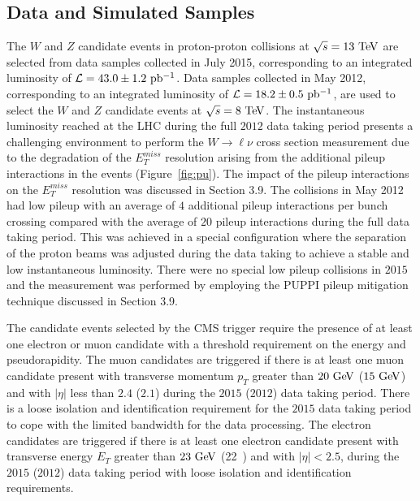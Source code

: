 \subsection{Data and Simulated Samples}

The $W$ and $Z$ candidate events in proton-proton collisions at $\sqrt{s}=13~\mathrm{Te\kern -0.1em V}$ are selected from data samples collected in July 2015, corresponding to an integrated luminosity of $\mathcal{L}=43.0\pm1.2~\mathrm{pb^{-1}}$. Data samples collected in May 2012, corresponding to an integrated luminosity of $\mathcal{L}=18.2\pm0.5~\mathrm{pb^{-1}}$, are used to select the $W$ and $Z$ candidate events at $\sqrt{s}=8~\mathrm{Te\kern -0.1em V}$. The instantaneous luminosity reached at the LHC during the full $2012$ data taking period presents a challenging environment to perform the $W \rightarrow \ell \nu$ cross section measurement due to the degradation of the $E_{T}^{miss}$ resolution arising from the additional pileup interactions in the events (Figure~\ref{fig:pu}). The impact of the pileup interactions on the $E_{T}^{miss}$ resolution was discussed in Section 3.9. The collisions in May 2012 had low pileup with an average of $4$ additional pileup interactions per bunch crossing compared with the average of $20$ pileup interactions during the full data taking period. This was achieved in a special configuration where the separation of the proton beams was adjusted during the data taking to achieve a stable and low instantaneous luminosity. There were no special low pileup collisions in $2015$ and the measurement was performed by employing the PUPPI pileup mitigation technique discussed in Section 3.9.

The candidate events selected by the CMS trigger require the presence of at least one electron or muon candidate with a threshold requirement on the energy and pseudorapidity. The muon candidates are triggered if there is at least one muon candidate present with transverse momentum $p_{T}$ greater than $20~\mathrm{Ge\kern -0.1em V}$ ($15~\mathrm{Ge\kern -0.1em V}$) and with $|\eta|$ less than $2.4$ ($2.1$) during the $2015$ ($2012$) data taking period. There is a loose isolation and identification requirement for the $2015$ data taking period to cope with the limited bandwidth for the data processing. The electron candidates are triggered if there is at least one electron candidate present with transverse energy $E_{T}$ greater than $23~\mathrm{Ge\kern -0.1em V}$ (22~\GeV) and with $|\eta|<2.5$, during the $2015$ ($2012$) data taking period with loose isolation and identification requirements.

